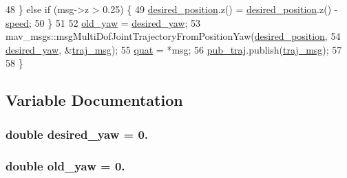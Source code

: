 \begin{DoxyCode}
48   \} \textcolor{keywordflow}{else} \textcolor{keywordflow}{if} (msg->z > 0.25) \{
49     \hyperlink{oculus-control_8cpp_a608d9948c063034b7605598daaeccc3e}{desired\_position}.z() = \hyperlink{oculus-control_8cpp_a608d9948c063034b7605598daaeccc3e}{desired\_position}.z() - 
      \hyperlink{oculus-control_8cpp_a7f7e4724cf57d59513b39c5ecc81adc8}{speed};
50   \}
51 
52   \hyperlink{oculus-control_8cpp_a6f2a069eeaa873686f0991fe351fec51}{old\_yaw} = \hyperlink{oculus-control_8cpp_a03a69ef33d756512293e67791ab5f265}{desired\_yaw};
53   mav\_msgs::msgMultiDofJointTrajectoryFromPositionYaw(\hyperlink{oculus-control_8cpp_a608d9948c063034b7605598daaeccc3e}{desired\_position},
54       \hyperlink{oculus-control_8cpp_a03a69ef33d756512293e67791ab5f265}{desired\_yaw}, &\hyperlink{oculus-control_8cpp_a090c0766fbb77862dd8cc0cca99d688b}{traj\_msg});
55   \hyperlink{oculus-control_8cpp_a71181c8a89676b15be113f74f57c9f23}{quat} = *msg;
56   \hyperlink{oculus-control_8cpp_a92b67ae724bc0d23b8e85e92e89403df}{pub\_traj}.publish(\hyperlink{oculus-control_8cpp_a090c0766fbb77862dd8cc0cca99d688b}{traj\_msg});
57 
58 \}
\end{DoxyCode}


\subsection{Variable Documentation}
\subsubsection[{\texorpdfstring{desired\+\_\+yaw}{desired_yaw}}]{\setlength{\rightskip}{0pt plus 5cm}double desired\+\_\+yaw = 0.}\hypertarget{oculus-control_8cpp_a03a69ef33d756512293e67791ab5f265}{}\label{oculus-control_8cpp_a03a69ef33d756512293e67791ab5f265}
\subsubsection[{\texorpdfstring{old\+\_\+yaw}{old_yaw}}]{\setlength{\rightskip}{0pt plus 5cm}double old\+\_\+yaw = 0.}\hypertarget{oculus-control_8cpp_a6f2a069eeaa873686f0991fe351fec51}{}\label{oculus-control_8cpp_a6f2a069eeaa873686f0991fe351fec51}
